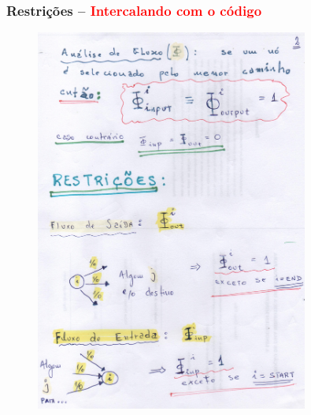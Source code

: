 \documentclass{beamer}
\begin{document}
\begin{frame}
	\frametitle{Restrições -- \textbf{\textcolor{red}{Intercalando com o código}}}
	
	\begin{figure}[ht!]
		\centering
		\includegraphics[width=0.8\textwidth , height=0.85\textheight]{12_restricoes.pdf}
	\end{figure}
	
\end{frame}
\end{document}
